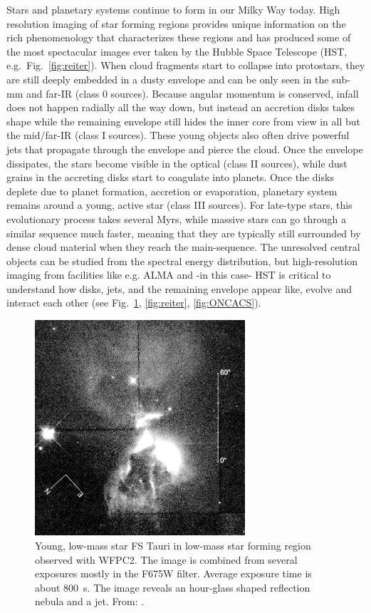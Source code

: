 \documentclass[12pt]{article}
\begin{document}
%
%
\justification          %
Stars and planetary systems continue to form in our Milky Way today. High resolution imaging of star forming regions provides unique information on the rich phenomenology that characterizes these regions and has produced some of the most spectacular images ever taken by
the Hubble Space Telescope (HST, e.g.\ Fig.~\ref{fig:reiter}).
When cloud fragments start to collapse into protostars, they are still deeply
embedded in a dusty envelope and can be only seen in the sub-mm and far-IR (class
0 sources). Because angular momentum is conserved, infall does not happen
radially all the way down, but instead an accretion disks takes shape while
the remaining envelope still hides the inner core from view in all but the
mid/far-IR (class I sources).  These young objects also often drive powerful jets
that propagate through the envelope and pierce the cloud. Once the envelope
dissipates, the stars become visible in the optical  (class II sources), while dust grains in the accreting disks start to coagulate
into planets. Once the disks deplete due to planet formation, accretion or
evaporation, planetary system remains around a young, active star
(class III sources). For late-type stars, this evolutionary process takes several Myrs,
while massive stars can go through a similar sequence much faster, meaning that
they are typically still surrounded by dense cloud material when they reach the main-sequence.
The unresolved central objects can be studied from the spectral energy distribution, but
high-resolution imaging from facilities like e.g. ALMA and -in this case- HST  is critical to understand how disks, jets, and the remaining envelope
appear like, evolve and interact each other (see Fig.~\ref{fig:krist}, \ref{fig:reiter},  \ref{fig:ONCACS}).


\begin{figure}
    \centering
    \includegraphics[height=8cm]{Krist98.png}
    \caption{Young, low-mass star FS Tauri in low-mass star forming region observed with WFPC2. The image is combined from several exposures mostly in the F675W filter. Average exposure time is about 800~s. The image reveals an hour-glass shaped reflection nebula and a jet. From: \citet{1998ApJ...501..841K}.}
    \label{fig:krist}
\end{figure}
\end{document}
